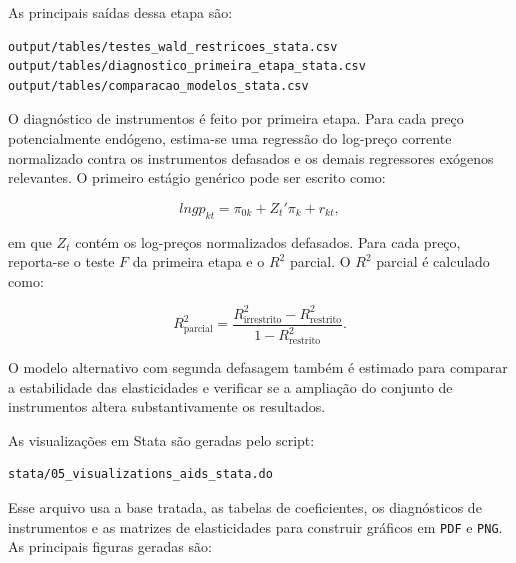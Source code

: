 \documentclass[12pt,a4paper]{article}
\begin{document}
As principais saídas dessa etapa são:

\begin{verbatim}
output/tables/testes_wald_restricoes_stata.csv
output/tables/diagnostico_primeira_etapa_stata.csv
output/tables/comparacao_modelos_stata.csv
\end{verbatim}

O diagnóstico de instrumentos é feito por primeira etapa. Para cada preço potencialmente endógeno, estima-se uma regressão do log-preço corrente normalizado contra os instrumentos defasados e os demais regressores exógenos relevantes. O primeiro estágio genérico pode ser escrito como:

\[
lngp_{kt}
=
\pi_{0k}
+
Z_t'\pi_k
+
r_{kt},
\tag{49}
\label{eq:primeira_etapa_aids}
\]

em que \(Z_t\) contém os log-preços normalizados defasados. Para cada preço, reporta-se o teste \(F\) da primeira etapa e o \(R^2\) parcial. O \(R^2\) parcial é calculado como:

\[
R^2_{\text{parcial}}
=
\frac{
R^2_{\text{irrestrito}}
-
R^2_{\text{restrito}}
}
{
1
-
R^2_{\text{restrito}}
}.
\tag{50}
\label{eq:r2_parcial_aids}
\]

O modelo alternativo com segunda defasagem também é estimado para comparar a estabilidade das elasticidades e verificar se a ampliação do conjunto de instrumentos altera substantivamente os resultados.

As visualizações em Stata são geradas pelo script:

\begin{verbatim}
stata/05_visualizations_aids_stata.do
\end{verbatim}

Esse arquivo usa a base tratada, as tabelas de coeficientes, os diagnósticos de instrumentos e as matrizes de elasticidades para construir gráficos em \texttt{PDF} e \texttt{PNG}. As principais figuras geradas são:
\end{document}
